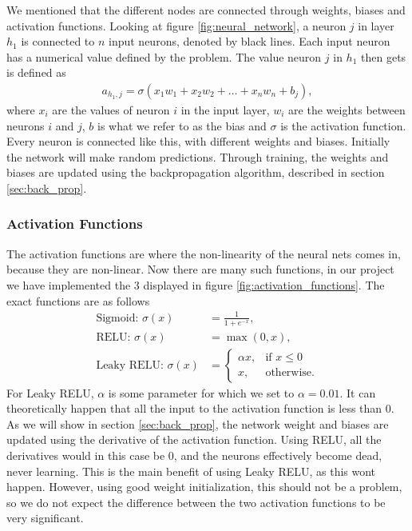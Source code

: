 \documentclass[12pt]{extarticle}
\begin{document}
We mentioned that the different nodes are connected through weights, biases and activation functions. Looking at figure \ref{fig:neural_network}, a neuron $j$ in layer $h_1$ is connected to $n$ input neurons, denoted by black lines. Each input neuron has a numerical value defined by the problem. The value neuron $j$ in $h_1$ then gets is defined as
\begin{align}
	a_{h_1, j} = \sigma (x_1w_1 + x_2w_2 + \dots + x_nw_n + b_j),
\end{align}
where $x_i$ are the values of neuron $i$ in the input layer, $w_i$ are the weights between neurons $i$ and $j$, $b$ is what we refer to as the bias and $\sigma$ is the activation function. Every neuron is connected like this, with different weights and biases. Initially the network will make random predictions. Through training, the weights and biases are updated using the backpropagation algorithm, described in section \ref{sec:back_prop}.

\subsubsection{Activation Functions}\label{sec:teo:act_funcs}
The activation functions are where the non-linearity of the neural nets comes in, because they are non-linear. Now there are many such functions, in our project we have implemented the 3 displayed in figure \ref{fig:activation_functions}. The exact functions are as follows
\begin{align}
	\text{Sigmoid: }\sigma(x)    & = \frac{1}{1 + e^{-x}},\label{eq:sigmoid}          \\
	\text{RELU: }\sigma(x)       & = \max(0,x), \label{eq:RELU}                       \\
	\text{Leaky RELU: }\sigma(x) & = \begin{cases}
		\alpha x, & \text{if } x\leq 0 \\
		x,        & \text{otherwise}.
	\end{cases} \label{eq:leaky_RELU}
\end{align}
For Leaky RELU, $\alpha$ is some parameter for which we set to $\alpha = 0.01$. It can theoretically happen that all the input to the activation function is less than 0. As we will show in section \ref{sec:back_prop}, the network weight and biases are updated using the derivative of the activation function. Using RELU, all the derivatives would in this case be 0, and the neurons effectively become dead, never learning. This is the main benefit of using Leaky RELU, as this wont happen. However, using good weight initialization, this should not be a problem, so we do not expect the difference between the two activation functions to be very significant.
\end{document}
